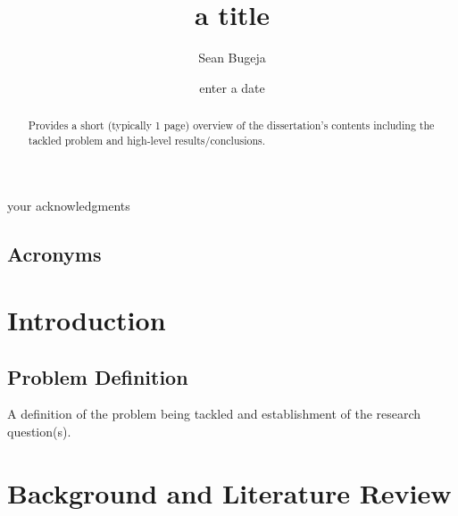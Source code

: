 \documentclass[12pt, a4paper]{report}
\theoremstyle{definition}
\theoremstyle{definition}%
\theoremstyle{definition}%
\theoremstyle{definition}%
\theoremstyle{definition}%
\theoremstyle{definition}%
\begin{document}
\title{a title}
\author{Sean Bugeja}
\date{enter a date}

\frontmatter


\begin{acknowledgements}
	your acknowledgments
\end{acknowledgements}

\begin{abstract}
	Provides a short (typically 1 page) overview of the dissertation’s contents including the tackled problem and high-level results/conclusions.
\end{abstract}

\tableofcontents

\listoffigures

\listoftables

\newpage
\section*{Acronyms}
\begin{acronym}
\end{acronym}


\mainmatter

\chapter{Introduction}

\section{Problem Definition}
A definition of the problem being tackled and establishment of the research question(s).


\chapter{Background and Literature Review}
\end{document}
